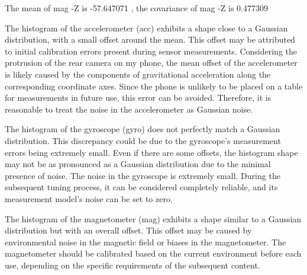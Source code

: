 The mean of mag -Z is -57.647071 
, the covariance of mag -Z is 0.477309 




The histogram of the accelerometer (acc) exhibits a shape close to a Gaussian distribution, with a small offset around the mean. This offset may be attributed to initial calibration errors present during sensor measurements. Considering the protrusion of the rear camera on my phone, the mean offset of the accelerometer is likely caused by the components of gravitational acceleration along the corresponding coordinate axes. Since the phone is unlikely to be placed on a table for measurements in future use, this error can be avoided. Therefore, it is reasonable to treat the noise in the accelerometer as Gaussian noise.

The histogram of the gyroscope (gyro) does not perfectly match a Gaussian distribution. This discrepancy could be due to the gyroscope's measurement errors being extremely small. Even if there are some offsets, the histogram shape may not be as pronounced as a Gaussian distribution due to the minimal presence of noise.
The noise in the gyroscope is extremely small. During the subsequent tuning process, it can be considered completely reliable, and its measurement model's noise can be set to zero.


The histogram of the magnetometer (mag) exhibits a shape similar to a Gaussian distribution but with an overall offset. This offset may be caused by environmental noise in the magnetic field or biases in the magnetometer.
The magnetometer should be calibrated based on the current environment before each use, depending on the specific requirements of the subsequent content.



